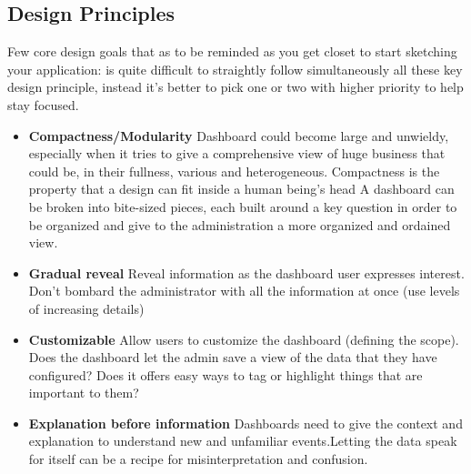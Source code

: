 \documentclass[a4paper,12pt]{report}
\begin{document}
\subsection{Design Principles}
Few core design goals that as to be reminded as you get closet to start sketching your application: is quite difficult to straightly follow simultaneously all these key design principle, instead it's better to pick one or two with higher priority to help stay focused.
\begin{itemize}
    \item \textbf{Compactness/Modularity}\newline
    Dashboard could become large and unwieldy, especially when it tries to give a comprehensive view of huge business that could be, in their fullness, various and heterogeneous. Compactness is the property that a design can fit inside a human being's head
    A dashboard can be broken into bite-sized pieces, each built around a key question in order to be organized and give to the administration a more organized and ordained view.
    \item \textbf{Gradual reveal}\newline
    Reveal information as the dashboard user expresses interest. Don't bombard the administrator with all the information at once (use levels of increasing details)
    \item \textbf{Customizable}\newline   
    Allow users to customize the dashboard (defining the scope). 
    Does the dashboard let the admin save a view of the data that they have configured? \newline
    Does it offers easy ways to tag or highlight things that are important to them?
    \item \textbf{Explanation before information}\newline
    Dashboards need to give the context and explanation to understand new and unfamiliar events.Letting the data speak for itself can be a recipe for misinterpretation and confusion.
\end{itemize}
\end{document}
